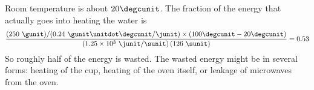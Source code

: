 Room temperature is about $20\degcunit$. 
The fraction of the energy that actually goes into heating the water is
\begin{equation*}
\frac{(250\ \gunit)/(0.24\ \gunit\unitdot\degcunit/\junit)\times(100\degcunit-20\degcunit)}{\left(1.25\times10^3\ \junit/\sunit\right)(126\ \sunit)} = 0.53
\end{equation*}
So roughly half of the energy is wasted. The wasted energy
might be in several forms: heating of the cup, heating of
the oven itself, or leakage of microwaves from the oven.




